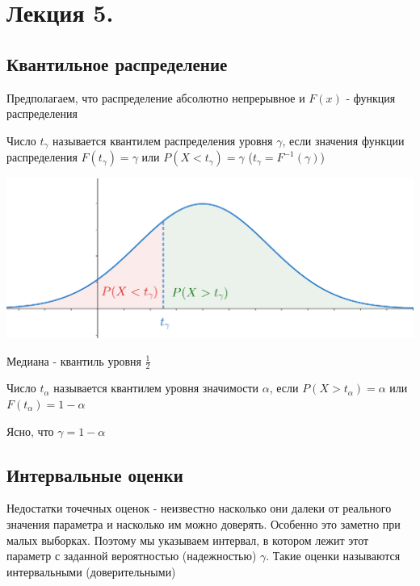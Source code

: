 \documentclass[12pt]{article}
\begin{document}






\section{Лекция 5.}

\subsection{Квантильное распределение}

Предполагаем, что распределение абсолютно непрерывное и $F(x)$ - функция распределения

 Число $t_\gamma$ называется квантилем распределения уровня $\gamma$, если значения
функции распределения $F(t_\gamma) = \gamma$ или $P(X < t_\gamma) = \gamma$ ($t_\gamma = F^{-1}(\gamma)$)


\begin{center}
    \includegraphics[width=15cm]{mathstat/images/mathstat_2025_03_11_1}
\end{center}

\Ex Медиана - квантиль уровня $\frac{1}{2}$

 Число $t_\alpha$ называется квантилем уровня значимости $\alpha$, если
$P(X > t_\alpha) = \alpha$ или $F(t_\alpha) = 1 - \alpha$

Ясно, что $\gamma = 1 - \alpha$

\subsection{Интервальные оценки}

Недостатки точечных оценок - неизвестно насколько они далеки от реального значения параметра и 
насколько им можно доверять. Особенно это заметно при малых выборках. Поэтому мы указываем интервал, в котором 
лежит этот параметр с заданной вероятностью (надежностью) $\gamma$. Такие оценки называются интервальными 
(доверительными)
\end{document}
